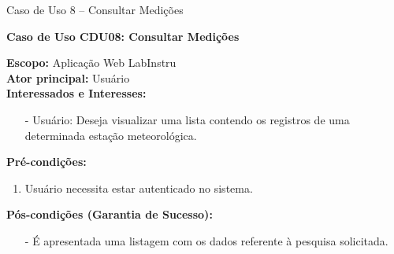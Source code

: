 	\begin{quadro}[h!]\caption{Caso de Uso 8 --  Consultar Medições}
	\hfill
	\end{quadro}
	\begin{mdframed}

		\textbf{Caso de Uso CDU08: Consultar Medições}\\

		\begin{flushleft}

		\textbf{Escopo:} Aplicação Web LabInstru\\

		\textbf{Ator principal:} Usuário\\

		\textbf{Interessados e Interesses:}
		\begin{itemize}
			\item[-] Usuário: Deseja visualizar uma lista contendo os registros de uma determinada estação meteorológica.
		\end{itemize}

		\textbf{Pré-condições:}\\
			 \begin{enumerate}
			 	\item{Usuário necessita estar autenticado no sistema.}
			 \end{enumerate}

		\textbf{Pós-condições (Garantia de Sucesso):}
		\begin{itemize}
			\item[-] É apresentada uma listagem com os dados referente à pesquisa  solicitada.
		\end{itemize}


\end{flushleft}
\end{mdframed}
